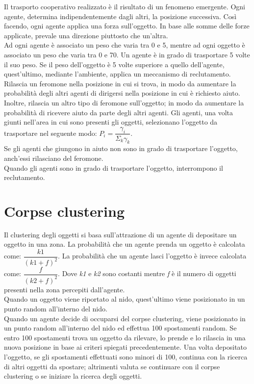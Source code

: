 \documentclass[12pt,a4paper,openright,twoside]{report}
\begin{document}
Il trasporto cooperativo realizzato è il risultato di un fenomeno emergente. Ogni agente, determina indipendentemente dagli altri, la posizione successiva. Così facendo, ogni agente applica una forza sull'oggetto. In base alle somme delle forze applicate, prevale una direzione piuttosto che un'altra.\\
Ad ogni agente è associato un peso che varia tra 0 e 5, mentre ad ogni oggetto è associato un peso che varia tra 0 e 70. Un agente è in grado di trasportare 5 volte il suo peso. Se il peso dell'oggetto è 5 volte superiore a quello dell'agente, quest'ultimo, mediante l'ambiente, applica un meccanismo di reclutamento. Rilascia un feromone nella posizione in cui si trova, in modo da aumentare la probabilità degli altri agenti di dirigersi nella posizione in cui è richiesto aiuto. Inoltre, rilascia un altro tipo di feromone sull'oggetto; in modo da aumentare la probabilità di ricevere aiuto da parte degli altri agenti. Gli agenti, una volta giunti nell'area in cui sono presenti gli oggetti, selezionano l'oggetto da trasportare nel seguente modo: $P_i =\dfrac{\gamma_i}{\Sigma_k \gamma_k}$.\\ Se gli agenti che giungono in aiuto non sono in grado di trasportare l'oggetto, anch'essi rilasciano del feromone.\\
Quando gli agenti sono in grado di trasportare l'oggetto, interrompono il reclutamento.

\section{Corpse clustering}

Il clustering degli oggetti si basa sull'attrazione di un agente di depositare un oggetto in una zona. La probabilità che un agente prenda un oggetto è calcolata come: $\dfrac{k1}{(k1+f)^2}$. La probabilità che un agente lasci l'oggetto è invece calcolata come: $\dfrac{f}{(k2+f)^2}$. Dove \textit{k1} e \textit{k2} sono costanti mentre \textit{f} è il numero di oggetti presenti nella zona percepiti dall'agente.\\
Quando un oggetto viene riportato al nido, quest'ultimo viene posizionato in un punto random all'interno del nido.\\
Quando un agente decide di occuparsi del corpse clustering, viene posizionato in un punto random all'interno del nido ed effettua 100 spostamenti random. Se entro 100 spostamenti trova un oggetto da rilevare, lo prende e lo rilascia in una nuova posizione in base ai criteri spiegati precedentemente. Una volta depositato l'oggetto, se gli spostamenti effettuati sono minori di 100, continua con la ricerca di altri oggetti da spostare; altrimenti valuta se continuare con il corpse clustering o se iniziare la ricerca degli oggetti.
\end{document}
